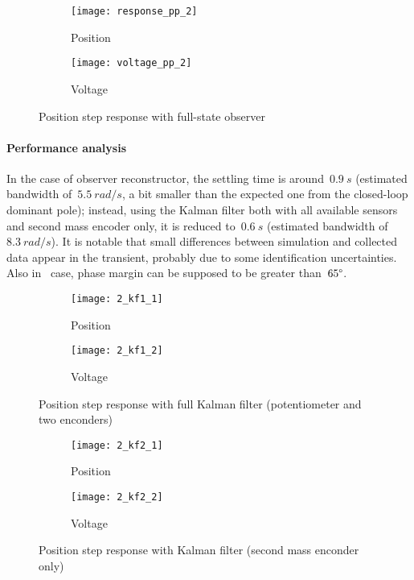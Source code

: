\begin{figure*}[h]
	\centering
	\begin{subfigure}{0.5\columnwidth}
		\texttt{[image: response\_pp\_2]}
		\caption{Position}
	\end{subfigure}
	\begin{subfigure}{0.45\columnwidth}
		\texttt{[image: voltage\_pp\_2]}
		\caption{Voltage}
	\end{subfigure}
	\caption{Position step response with full-state observer}
\end{figure*}

\paragraph{Performance analysis}
In the case of observer reconstructor, the settling time is around~$0.9\ s$ (estimated bandwidth of~$5.5\ rad/s$, a bit smaller than the expected one from the closed-loop dominant pole); instead, using the Kalman filter both with all available sensors and second mass encoder only, it is reduced to~$0.6\ s$ (estimated bandwidth of~$8.3\ rad/s$). It is notable that small differences between simulation and collected data appear in the transient, probably due to some identification uncertainties.
Also in \twodof\ case, phase margin can be supposed to be greater than~$65\degree$.
\begin{figure*}[h]
	\centering
	\begin{subfigure}{0.5\columnwidth}
		\texttt{[image: 2\_kf1\_1]}
		\caption{Position}
	\end{subfigure}
	\begin{subfigure}{0.45\columnwidth}
		\texttt{[image: 2\_kf1\_2]}
		\caption{Voltage}
	\end{subfigure}
	\caption{Position step response with full Kalman filter (potentiometer and two enconders)}
\end{figure*}

\begin{figure*}[h]
	\centering
	\begin{subfigure}{0.5\columnwidth}
		\texttt{[image: 2\_kf2\_1]}
		\caption{Position}
	\end{subfigure}
	\begin{subfigure}{0.45\columnwidth}
		\texttt{[image: 2\_kf2\_2]}
		\caption{Voltage}
	\end{subfigure}
	\caption{Position step response with Kalman filter (second mass enconder only)}
\end{figure*}